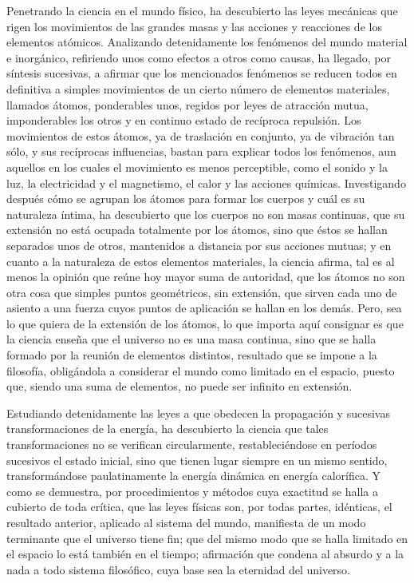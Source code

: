 \documentclass[a4paper, 12pt]{article}
\begin{document}
Penetrando la ciencia en el mundo físico, ha descubierto las leyes mecánicas que rigen los movimientos de las grandes masas y las acciones y reacciones de los elementos atómicos. Analizando detenidamente los fenómenos del mundo material e inorgánico, refiriendo unos como efectos a otros como causas, ha llegado, por síntesis sucesivas, a afirmar que los mencionados fenómenos se reducen todos en definitiva a simples movimientos de un cierto número de elementos materiales, llamados átomos, ponderables unos, regidos por leyes de atracción mutua, imponderables los otros y en continuo estado de recíproca repulsión. Los movimientos de estos átomos, ya de traslación en conjunto, ya de vibración tan sólo, y sus recíprocas influencias, bastan para explicar todos los fenómenos, aun aquellos en los cuales el movimiento es menos perceptible, como el sonido y la luz, la electricidad y el magnetismo, el calor y las acciones químicas. Investigando después cómo se agrupan los átomos para formar los cuerpos y cuál es su naturaleza íntima, ha descubierto que los cuerpos no son masas continuas, que su extensión no está ocupada totalmente por los átomos, sino que éstos se hallan separados unos de otros, mantenidos a distancia por sus acciones mutuas; y en cuanto a la naturaleza de estos elementos materiales, la ciencia afirma, tal es al menos la opinión que reúne hoy mayor suma de autoridad, que los átomos no son otra cosa que simples puntos geométricos, sin extensión, que sirven cada uno de asiento a una fuerza cuyos puntos de aplicación se hallan en los demás. Pero, sea lo que quiera de la extensión de los átomos, lo que importa aquí consignar es que la ciencia enseña que el universo no es una masa continua, sino que se halla formado por la reunión de elementos distintos, resultado que se impone a la filosofía, obligándola a considerar el mundo como limitado en el espacio, puesto que, siendo una suma de elementos, no puede ser infinito en extensión.

Estudiando detenidamente las leyes a que obedecen la propagación y sucesivas transformaciones de la energía, ha descubierto la ciencia que tales transformaciones no se verifican circularmente, restableciéndose en períodos sucesivos el estado inicial, sino que tienen lugar siempre en un mismo sentido, transformándose paulatinamente la energía dinámica en energía calorífica. Y como se demuestra, por procedimientos y métodos cuya exactitud se halla a cubierto de toda crítica, que las leyes físicas son, por todas partes, idénticas, el resultado anterior, aplicado al sistema del mundo, manifiesta de un modo terminante que el universo tiene fin; que del mismo modo que se halla limitado en el espacio lo está también en el tiempo; afirmación que condena al absurdo y a la nada a todo sistema filosófico, cuya base sea la eternidad del universo.
\end{document}

